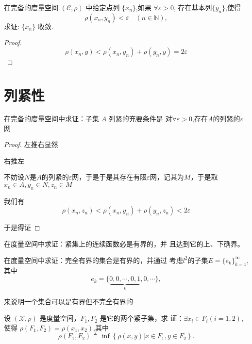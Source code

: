 \documentclass[lang=cn,10pt]{elegantbook}
\begin{document}
	\begin{exercise}
		在完备的度量空间 $(\mathscr{C},\rho)$ 中给定点列 $\{x_n\}$,如果 $\forall\varepsilon>0$,
		存在基本列$\{y_n\}$,使得
		\begin{equation*}
			\rho(x_n,y_n)<\varepsilon\quad(n\in\mathbb{N}),
		\end{equation*}
		$\text{求证: }\{x_n\}\text{ 收敛}.$
	\end{exercise}
	\begin{proof}
		\begin{equation*}
		\rho \left( x_n,y \right) <\rho \left( x_n,y_n \right) +\rho \left( y_n,y \right) =2\varepsilon 
		\end{equation*}
	\end{proof}
	\section{列紧性}
	\begin{exercise}
		在完备的度量空间中求证：子集 $A$ 列紧的充要条件是
		对$\forall\varepsilon>0$,存在$A$的列紧的$\varepsilon$网
	\end{exercise}
	\begin{proof}
		
		左推右显然
		
		右推左
		
		不妨设$N$是$A$的列紧的$\varepsilon$网，于是于是其存在有限$\varepsilon$网，记其为$M$，于是取$x_n \in A,y_{n}\in N,z_n \in M$
		
		我们有
		\begin{equation*}
			\rho(x_{n},z_{n})<\rho(x_{n},y_{n})+\rho(y_{n},z_{n})<2\varepsilon
		\end{equation*}
		
		于是得证
	\end{proof}
	\begin{exercise}
		在度量空间中求证：紧集上的连续函数必是有界的，并
		且达到它的上、下确界。
	\end{exercise}
	\begin{exercise}
		在度量空间中求证：完全有界的集合是有界的，并通过
		考虑$l^2$的子集$E=\{e_k\}_{k=1}^{\infty}$,其中
		\begin{equation*}
			e_k=\{\underbrace{0,0,\cdots,0,1}_k,0,\cdots\},
		\end{equation*}
		
		来说明一个集合可以是有界但不完全有界的
	\end{exercise}
	\begin{exercise}
		设 $(\mathscr{X},\rho)$ 是度量空间，$F_1,F_2$ 是它的两个紧子集，求
		证：$\exists x_i\in F_i(i=1,2)$, 使得 $\rho(F_1,F_2)=\rho(x_1,x_2)$,其中
		\begin{equation*}
			\rho(F_1,F_2)\triangleq\inf\left\{\rho(x,y)|x\in F_1,y\in F_2\right\}.
		\end{equation*}
	\end{exercise}
\end{document}
